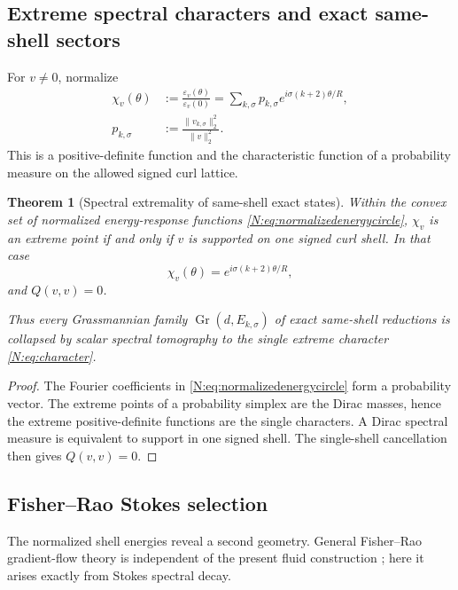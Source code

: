 \documentclass[
 aps,
 prd,
 reprint,
 amsmath,
 amssymb,
 nofootinbib,
 superscriptaddress
]{revtex4-2}
\newtheorem{theorem}{Theorem}[section]
\theoremstyle{definition}
\theoremstyle{remark}
\newcommand{\Gr}{\operatorname{Gr}}
\begin{document}
\subsection{Extreme spectral characters and exact same-shell sectors}

For \(v\neq0\), normalize
\begin{align}
 \chi_v(\theta)
 &:=
 \frac{\varepsilon_v(\theta)}{\varepsilon_v(0)}
 =
 \sum_{k,\sigma}
 p_{k,\sigma}
 e^{i\sigma(k+2)\theta/R},
 \label{N:eq:normalizedenergycircle}\\
 p_{k,\sigma}
 &:=
 \frac{\|v_{k,\sigma}\|_2^2}{\|v\|_2^2}.
 \label{N:eq:spectralprob}
\end{align}
This is a positive-definite function and the characteristic function of a
probability measure on the allowed signed curl lattice.

\begin{theorem}[Spectral extremality of same-shell exact states]
\label{N:thm:extreme}
Within the convex set of normalized energy-response functions
\eqref{N:eq:normalizedenergycircle}, \(\chi_v\) is an extreme point if and
only if \(v\) is supported on one signed curl shell.  In that case
\begin{equation}
 \boxed{
 \chi_v(\theta)
 =
 e^{i\sigma(k+2)\theta/R},
 }
 \label{N:eq:character}
\end{equation}
and \(Q(v,v)=0\).

Thus every Grassmannian family
\(\Gr(d,E_{k,\sigma})\) of exact same-shell reductions is collapsed by
scalar spectral tomography to the single extreme character
\eqref{N:eq:character}.
\end{theorem}

\begin{proof}
The Fourier coefficients in
\eqref{N:eq:normalizedenergycircle} form a probability vector.
The extreme points of a probability simplex are the Dirac masses, hence the
extreme positive-definite functions are the single characters.  A Dirac
spectral measure is equivalent to support in one signed shell.  The
single-shell cancellation then gives \(Q(v,v)=0\).
\end{proof}

\subsection{Fisher--Rao Stokes selection}

The normalized shell energies reveal a second geometry.  General
Fisher--Rao gradient-flow theory is independent of the present fluid
construction \cite{Carrillo2026}; here it arises exactly from Stokes
spectral decay.
\end{document}
